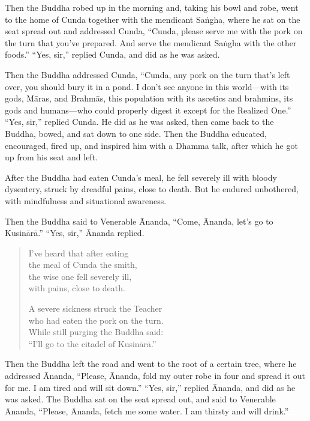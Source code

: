 \documentclass[12pt,openany]{book}%
\begin{document}
Then the Buddha robed up in the morning and, taking his bowl and robe, went to the home of Cunda together with the mendicant \textsanskrit{Saṅgha}, where he sat on the seat spread out and addressed Cunda, “Cunda, please serve me with the pork on the turn that you’ve prepared. And serve the mendicant \textsanskrit{Saṅgha} with the other foods.” “Yes, sir,” replied Cunda, and did as he was asked. 

Then the Buddha addressed Cunda, “Cunda, any pork on the turn that’s left over, you should bury it in a pond. I don’t see anyone in this world—with its gods, \textsanskrit{Māras}, and \textsanskrit{Brahmās}, this population with its ascetics and brahmins, its gods and humans—who could properly digest it except for the Realized One.” “Yes, sir,” replied Cunda. He did as he was asked, then came back to the Buddha, bowed, and sat down to one side. Then the Buddha educated, encouraged, fired up, and inspired him with a Dhamma talk, after which he got up from his seat and left. 

After the Buddha had eaten Cunda’s meal, he fell severely ill with bloody dysentery, struck by dreadful pains, close to death. But he endured unbothered, with mindfulness and situational awareness. 

Then the Buddha said to Venerable Ānanda, “Come, Ānanda, let’s go to \textsanskrit{Kusinārā}.” “Yes, sir,” Ānanda replied. 

\begin{verse}%
I’ve heard that after eating \\
the meal of Cunda the smith, \\
the wise one fell severely ill, \\
with pains, close to death. 

A severe sickness struck the Teacher \\
who had eaten the pork on the turn. \\
While still purging the Buddha said: \\
“I’ll go to the citadel of \textsanskrit{Kusinārā}.” 

%
\end{verse}

Then the Buddha left the road and went to the root of a certain tree, where he addressed Ānanda, “Please, Ānanda, fold my outer robe in four and spread it out for me. I am tired and will sit down.” “Yes, sir,” replied Ānanda, and did as he was asked. The Buddha sat on the seat spread out, and said to Venerable Ānanda, “Please, Ānanda, fetch me some water. I am thirsty and will drink.” 
\end{document}
